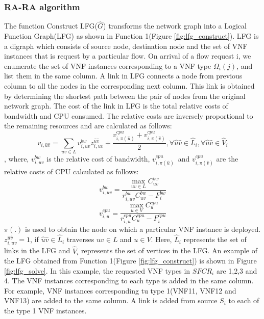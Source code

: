 \subsubsection{RA-RA algorithm}
The function Construct LFG($\hat{G}$) transforms the network graph into a Logical Function Graph(LFG) as shown in Function 1(Figure \ref{fig:lfg_construct}). LFG is a digraph which consists of source node, destination node and the set of VNF instances that is request by a particular flow. On arrival of a flow request i, we enumerate the set of VNF instances corresponding to a VNF type $\Omega_i(j)$, and list them in the same column. A link in LFG connects a node from previous column to all the nodes in the corresponding next column. This link is obtained by determining the shortest path between the pair of nodes from the original network graph. The cost of the link in LFG is the total relative costs of bandwidth and CPU consumed. The relative costs are inversely proportional to the remaining resources and are calculated as follows:\\
$$v_{i,\hat{u}\hat{v}} = \sum_{uv \in L} v_{i,uv}^{bw}z_{i,uv}^{\hat{u}\hat{v}} + \frac{v_{i,\pi(\hat{u})}^{cpu} + v_{i,\pi(\hat{v})}^{cpu}}{2}, \forall \hat{u}\hat{v} \in \hat{L}_i, \forall \hat{u}\hat{v} \in \hat{V}_i$$,
where, $v_{i,uv}^{bw}$ is the relative cost of bandwidth,  $v_{i,\pi(\hat{u})}^{cpu}$\ and $v_{i,\pi(\hat{v})}^{cpu}$ are the relative costs of CPU calculated as follows:\\
$$v_{i,uv}^{bw} = \frac{\max_{uv \in L}C_{uv}^{bw}}{r_{i,uv}^{bw}C_{uv}^{bw} - F_i^{bw}}$$
$$v_{i,u}^{cpu} = \frac{\max_{u \in V}C_{u}^{cpu}}{r_{i,u}^{cpu}C_{u}^{cpu} - F_i^{cpu}}$$
$\pi(.)$ is used to obtain the node on which a particular VNF instance is deployed. $z_{i,uv}^{\hat{u}\hat{v}} = 1$, if $\hat{u}\hat{v} \in \hat{L}_i$ traverses $uv \in L$ and $u \in V$. Here, $\hat{L}_i$ represents the set of links in the LFG and $\hat{V}_i$ represents the set of vertices in the LFG. An example of the LFG obtained from Function 1(Figure \ref{fig:lfg_construct}) is shown in Figure \ref{fig:lfg_solve}. In this example, the requested VNF types in $SFCR_i$ are 1,2,3 and 4. The VNF instances corresponding to each type is added in the same column. For example, VNF instances corresponding tu type 1(VNF11, VNF12 and VNF13) are added to the same column. A link is added from source $S_i$ to each of the type 1 VNF instances.

